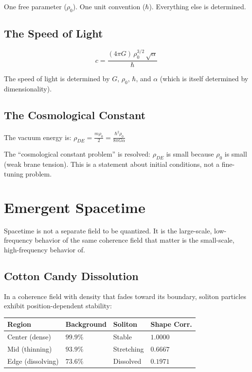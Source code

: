 \documentclass[11pt, a4paper]{article}
\begin{document}
One free parameter ($\rho_0$). One unit convention ($\hbar$).
Everything else is determined.

\subsection{The Speed of Light}

\begin{equation}
  \boxed{c = \frac{(4\pi G)\,\rho_0^{3/2}\,\sqrt{\alpha}}{\hbar}}
\end{equation}

The speed of light is determined by $G$, $\rho_0$, $\hbar$, and
$\alpha$ (which is itself determined by dimensionality).

\subsection{The Cosmological Constant}

The vacuum energy is:
$\rho_{DE} = \frac{m\rho_0}{2}
= \frac{\hbar^2\rho_0}{8\pi G\alpha}$

The ``cosmological constant problem'' is resolved: $\rho_{DE}$ is
small because $\rho_0$ is small (weak brane tension). This is a
statement about initial conditions, not a fine-tuning problem.

\section{Emergent Spacetime}

Spacetime is not a separate field to be quantized. It is the
large-scale, low-frequency behavior of the same coherence field
that matter is the small-scale, high-frequency behavior of.

\subsection{Cotton Candy Dissolution}

In a coherence field with density that fades toward its boundary,
soliton particles exhibit position-dependent stability:

\begin{center}
\begin{tabular}{@{}llll@{}}
\toprule
\textbf{Region} & \textbf{Background} & \textbf{Soliton} &
\textbf{Shape Corr.} \\
\midrule
Center (dense) & $99.9\%$ & Stable & $1.0000$ \\
Mid (thinning) & $93.9\%$ & Stretching & $0.6667$ \\
Edge (dissolving) & $73.6\%$ & Dissolved & $0.1971$ \\
\bottomrule
\end{tabular}
\end{center}
\end{document}
